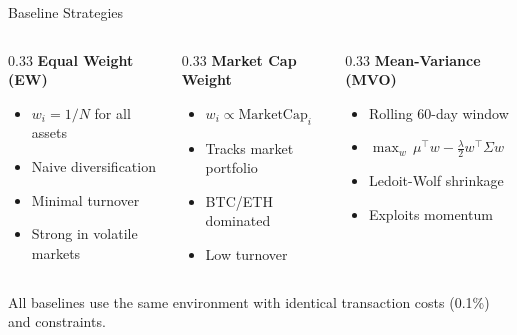 \documentclass[aspectratio=169]{beamer}
\begin{document}
\begin{frame}{Baseline Strategies}
\small

\begin{columns}[T,totalwidth=\textwidth]
\begin{column}{0.33\textwidth}
\textbf{Equal Weight (EW)}~\citep{demiguel2009optimal}
\begin{itemize}\setlength{\itemsep}{3pt}
  \item $w_i = 1/N$ for all assets
  \item Naive diversification
  \item Minimal turnover
  \item Strong in volatile markets
\end{itemize}
\end{column}

\begin{column}{0.33\textwidth}
\textbf{Market Cap Weight}
\begin{itemize}\setlength{\itemsep}{3pt}
  \item $w_i \propto \text{MarketCap}_i$
  \item Tracks market portfolio
  \item BTC/ETH dominated
  \item Low turnover
\end{itemize}
\end{column}

\begin{column}{0.33\textwidth}
\textbf{Mean-Variance (MVO)}~\citep{markowitz1952portfolio}
\begin{itemize}\setlength{\itemsep}{3pt}
  \item Rolling 60-day window
  \item $\max_w \, \mu^\top w - \frac{\lambda}{2} w^\top \Sigma w$
  \item Ledoit-Wolf shrinkage~\citep{ledoit2004honey}
  \item Exploits momentum
\end{itemize}
\end{column}
\end{columns}

\vspace{1em}
\centering
\footnotesize
All baselines use the same environment with identical transaction costs (0.1\%) and constraints.

\end{frame}
\end{document}
